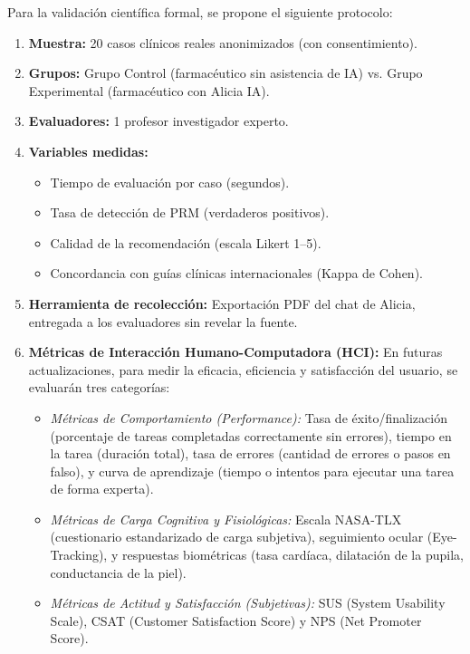 \documentclass[12pt,a4paper]{article}
\begin{document}
Para la validación científica formal, se propone el siguiente protocolo:

\begin{enumerate}
  \item \textbf{Muestra:} 20 casos clínicos reales anonimizados (con consentimiento).
  \item \textbf{Grupos:} Grupo Control (farmacéutico sin asistencia de IA) vs. Grupo Experimental
    (farmacéutico con Alicia IA).
  \item \textbf{Evaluadores:} 1 profesor investigador experto.
  \item \textbf{Variables medidas:}
    \begin{itemize}
      \item Tiempo de evaluación por caso (segundos).
      \item Tasa de detección de PRM (verdaderos positivos).
      \item Calidad de la recomendación (escala Likert 1--5).
      \item Concordancia con guías clínicas internacionales (Kappa de Cohen).
    \end{itemize}
  \item \textbf{Herramienta de recolección:} Exportación PDF del chat de Alicia, entregada a los
    evaluadores sin revelar la fuente.
  \item \textbf{Métricas de Interacción Humano-Computadora (HCI):} En futuras actualizaciones, para medir la eficacia, eficiencia y satisfacción del usuario, se evaluarán tres categorías:
    \begin{itemize}
      \item \textit{Métricas de Comportamiento (Performance):} Tasa de éxito/finalización (porcentaje de tareas completadas correctamente sin errores), tiempo en la tarea (duración total), tasa de errores (cantidad de errores o pasos en falso), y curva de aprendizaje (tiempo o intentos para ejecutar una tarea de forma experta).
      \item \textit{Métricas de Carga Cognitiva y Fisiológicas:} Escala NASA-TLX (cuestionario estandarizado de carga subjetiva), seguimiento ocular (Eye-Tracking), y respuestas biométricas (tasa cardíaca, dilatación de la pupila, conductancia de la piel).
      \item \textit{Métricas de Actitud y Satisfacción (Subjetivas):} SUS (System Usability Scale), CSAT (Customer Satisfaction Score) y NPS (Net Promoter Score).
    \end{itemize}
\end{enumerate}
\end{document}
